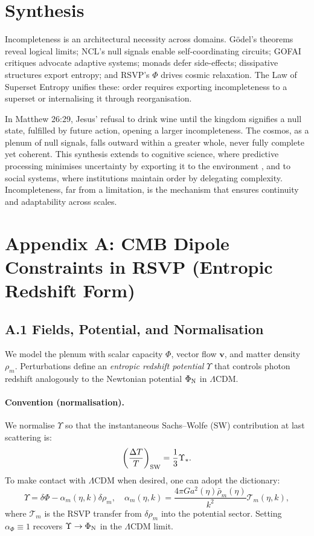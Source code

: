 \documentclass{article}
\begin{document}
{{\section{Synthesis}
\label{sec:synthesis}
Incompleteness is an architectural necessity across domains. G\"{o}del's theorems reveal logical limits; NCL's null signals enable self-coordinating circuits; GOFAI critiques advocate adaptive systems; monads defer side-effects; dissipative structures export entropy; and RSVP's \(\Phi\) drives cosmic relaxation. The Law of Superset Entropy unifies these: order requires exporting incompleteness to a superset or internalising it through reorganisation.

In Matthew 26:29, Jesus' refusal to drink wine until the kingdom signifies a null state, fulfilled by future action, opening a larger incompleteness. The cosmos, as a plenum of null signals, falls outward within a greater whole, never fully complete yet coherent. This synthesis extends to cognitive science, where predictive processing minimises uncertainty by exporting it to the environment \citep{clark2013, hohwy2013}, and to social systems, where institutions maintain order by delegating complexity. Incompleteness, far from a limitation, is the mechanism that ensures continuity and adaptability across scales.

\newpage
\section*{Appendix A: CMB Dipole Constraints in RSVP (Entropic Redshift Form)}
\subsection*{A.1 Fields, Potential, and Normalisation}
We model the plenum with scalar capacity \(\Phi\), vector flow \(\mathbf{v}\), and matter density \(\rho_m\). Perturbations define an \textit{entropic redshift potential} \(\Upsilon\) that controls photon redshift analogously to the Newtonian potential \(\Phi_{\rm N}\) in \(\Lambda\)CDM.

\paragraph{Convention (normalisation).}
We normalise \(\Upsilon\) so that the instantaneous Sachs--Wolfe (SW) contribution at last scattering is:
\begin{equation}
\left( \frac{\Delta T}{T} \right)_{\rm SW} = \frac{1}{3} \Upsilon_*.
\label{eq:SWnorm}
\end{equation}
To make contact with \(\Lambda\)CDM when desired, one can adopt the dictionary:
\begin{equation}
\Upsilon = \delta\Phi - \alpha_m(\eta,k) \delta\rho_m, \quad \alpha_m(\eta,k) = \frac{4\pi G a^2(\eta) \bar{\rho}_m(\eta)}{k^2} \mathcal{T}_m(\eta,k),
\label{eq:dictionary}
\end{equation}
where \(\mathcal{T}_m\) is the RSVP transfer from \(\delta\rho_m\) into the potential sector. Setting \(\alpha_\Phi \equiv 1\) recovers \(\Upsilon \to \Phi_{\rm N}\) in the \(\Lambda\)CDM limit.

}}
\end{document}
